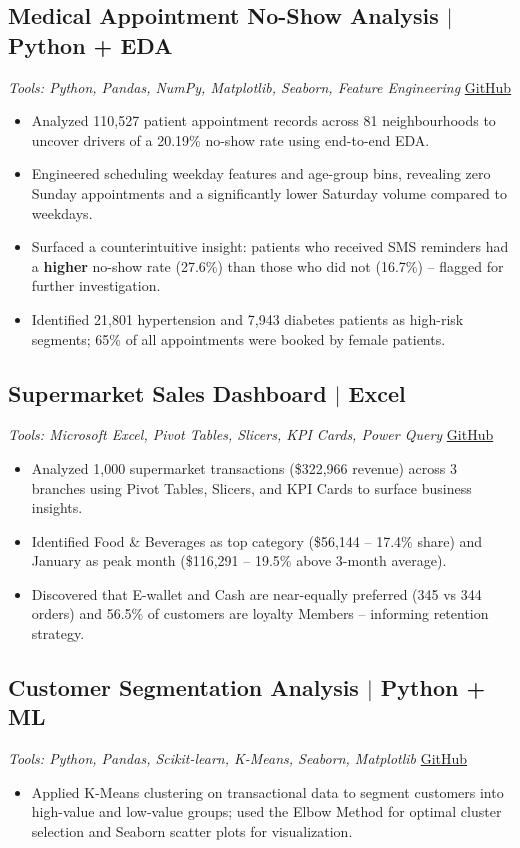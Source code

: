\documentclass[10pt]{article}
\begin{document}
\subsection{Medical Appointment No-Show Analysis $|$ Python + EDA}
\item \textit{Tools: Python, Pandas, NumPy, Matplotlib, Seaborn, Feature Engineering} \hfill \href{https://github.com/Ravindra8896}{GitHub}
\begin{itemize}
    \item Analyzed 110,527 patient appointment records across 81 neighbourhoods to uncover drivers of a 20.19\% no-show rate using end-to-end EDA.
    \item Engineered scheduling weekday features and age-group bins, revealing zero Sunday appointments and a significantly lower Saturday volume compared to weekdays.
    \item Surfaced a counterintuitive insight: patients who received SMS reminders had a \textbf{higher} no-show rate (27.6\%) than those who did not (16.7\%) -- flagged for further investigation.
    \item Identified 21,801 hypertension and 7,943 diabetes patients as high-risk segments; 65\% of all appointments were booked by female patients.
\end{itemize}

\subsection{Supermarket Sales Dashboard $|$ Excel}
\item \textit{Tools: Microsoft Excel, Pivot Tables, Slicers, KPI Cards, Power Query} \hfill \href{https://github.com/Ravindra8896}{GitHub}
\begin{itemize}
    \item Analyzed 1,000 supermarket transactions (\$322,966 revenue) across 3 branches using Pivot Tables, Slicers, and KPI Cards to surface business insights.
    \item Identified Food \& Beverages as top category (\$56,144 -- 17.4\% share) and January as peak month (\$116,291 -- 19.5\% above 3-month average).
    \item Discovered that E-wallet and Cash are near-equally preferred (345 vs 344 orders) and 56.5\% of customers are loyalty Members -- informing retention strategy.
\end{itemize}

\subsection{Customer Segmentation Analysis $|$ Python + ML}
\item \textit{Tools: Python, Pandas, Scikit-learn, K-Means, Seaborn, Matplotlib} \hfill \href{https://github.com/Ravindra8896}{GitHub}
\begin{itemize}
    \item Applied K-Means clustering on transactional data to segment customers into high-value and low-value groups; used the Elbow Method for optimal cluster selection and Seaborn scatter plots for visualization.
\end{itemize}
\end{document}
